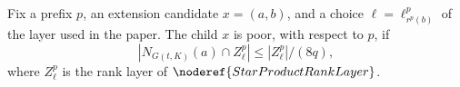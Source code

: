 \begin{definition}
Fix a prefix \(p\), an extension candidate \(x=(a,b)\), and a choice
\(\ell=\ell^p_{r^p(b)}\) of the layer used in the paper.  The child \(x\)
is poor, with respect to \(p\), if
\[
  |N_{G(t,K)}(a)\cap Z_\ell^p|\le |Z_\ell^p|/(8q),
\]
where \(Z_\ell^p\) is the rank layer of \(\noderef{StarProductRankLayer}\).
\end{definition}
